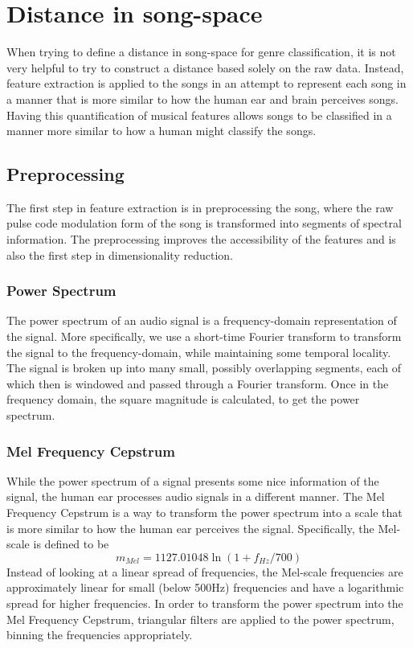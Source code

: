 \documentclass[12pt]{article}
\begin{document}
\section{Distance in song-space}

When trying to define a distance in song-space for genre classification, it is not very helpful to try to construct a distance based solely on the raw data.  Instead, feature extraction is applied to the songs in an attempt to represent each song in a manner that is more similar to how the human ear and brain perceives songs.  Having this quantification of musical features allows songs to be classified in a manner more similar to how a human might classify the songs.

\subsection{Preprocessing}

The first step in feature extraction is in preprocessing the song, where the raw pulse code modulation form of the song is transformed into segments of spectral information.  The preprocessing improves the accessibility of the features and is also the first step in dimensionality reduction.

\subsubsection{Power Spectrum}
The power spectrum of an audio signal is a frequency-domain representation of the signal.  More specifically, we use a short-time Fourier transform to transform the signal to the frequency-domain, while maintaining some temporal locality.  The signal is broken up into many small, possibly overlapping segments, each of which then is windowed and passed through a Fourier transform.  Once in the frequency domain, the square magnitude is calculated, to get the power spectrum.

\subsubsection{Mel Frequency Cepstrum}
While the power spectrum of a signal presents some nice information of the signal, the human ear processes audio signals in a different manner.  The Mel Frequency Cepstrum is a way to transform the power spectrum into a scale that is more similar to how the human ear perceives the signal.  Specifically, the Mel-scale is defined to be
$$ m_{Mel} = 1127.01048 \ln(1 + f_{Hz}/700) $$
Instead of looking at a linear spread of frequencies, the Mel-scale frequencies are approximately linear for small (below 500Hz) frequencies and have a logarithmic spread for higher frequencies.  In order to transform the power spectrum into the Mel Frequency Cepstrum, triangular filters are applied to the power spectrum, binning the frequencies appropriately.\\
\end{document}
